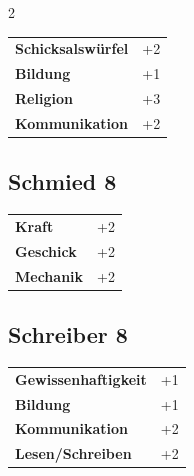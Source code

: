 \begin{multicols}{2}
\begin{tcolorbox}
\vspace{3mm}

\begin{tabular}{@{}ll@{}}
    \textbf{Schicksalswürfel} & +2\\
    \textbf{Bildung} & +1\\
    \textbf{Religion} & +3\\
    \textbf{Kommunikation} & +2\\
\end{tabular}


\end{tcolorbox}

\begin{tcolorbox}
    \subsection*{Schmied \hfill \small{8 }}
    \tcblower




\begin{tabular}{@{}ll@{}}
    \textbf{Kraft} & +2\\
    \textbf{Geschick} & +2\\
    \textbf{Mechanik} & +2\\
\end{tabular}


\end{tcolorbox}

\begin{tcolorbox}
    \subsection*{Schreiber \hfill \small{8 }}
    \tcblower




\begin{tabular}{@{}ll@{}}
    \textbf{Gewissenhaftigkeit} & +1\\
    \textbf{Bildung} & +1\\
    \textbf{Kommunikation} & +2\\
    \textbf{Lesen/Schreiben} & +2\\
\end{tabular}


\end{tcolorbox}
\end{multicols}
